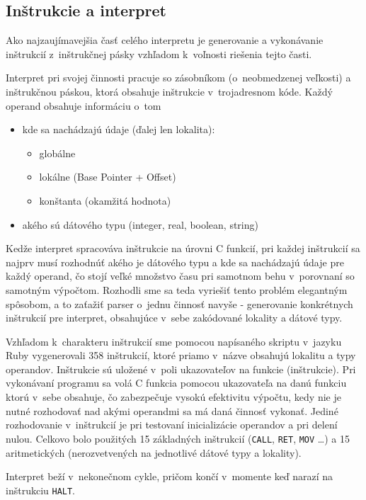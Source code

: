 \documentclass[12pt,a4paper,titlepage,final]{article}
\begin{document}
\subsection{Inštrukcie a interpret}
Ako najzaujímavejšia časť celého interpretu je generovanie a vykonávanie inštrukcií
z~inštrukčnej pásky vzhľadom k~voľnosti riešenia tejto časti.

Interpret pri svojej činnosti pracuje so zásobníkom (o~neobmedzenej veľkosti) a
inštrukčnou páskou, ktorá obsahuje inštrukcie v~trojadresnom kóde.
Každý operand obsahuje informáciu o~tom 
\begin{itemize}
	\item kde sa nachádzajú údaje (ďalej len lokalita):
		\begin{itemize}
			\item globálne
			\item lokálne (Base Pointer + Offset)
			\item konštanta (okamžitá hodnota)
		\end{itemize}
	\item akého sú dátového typu (integer, real, boolean, string)
\end{itemize}

Kedže interpret spracováva inštrukcie na úrovni C funkcií, pri každej inštrukcií
 sa najprv musí rozhodnúť akého je dátového typu a kde sa nachádzajú údaje pre 
 každý operand, čo stojí veľké množstvo času pri samotnom behu v~porovnaní 
 so samotným výpočtom.
Rozhodli sme sa teda vyriešiť tento problém elegantným spôsobom, 
 a to zaťažiť parser o~jednu činnosť navyše - generovanie konkrétnych 
 inštrukcií pre interpret, obsahujúce v~sebe zakódované lokality a dátové typy.

Vzhľadom k~charakteru inštrukcií sme pomocou napísaného skriptu v~jazyku Ruby
 vygenerovali 358 inštrukcií, 
 ktoré priamo v~názve obsahujú lokalitu a typy operandov.
Inštrukcie sú uložené v~poli ukazovateľov na funkcie (inštrukcie).
 Pri vykonávaní programu sa volá C funkcia pomocou ukazovateľa na danú 
 funkciu ktorú v~sebe obsahuje, čo zabezpečuje vysokú efektivitu výpočtu,
 kedy nie je nutné rozhodovať nad akými operandmi sa má daná činnosť vykonať.
 Jediné rozhodovanie v~inštrukcií je pri testovaní inicializácie operandov a pri delení nulou. Celkovo bolo použitých 15 základných inštrukcií (\texttt{CALL}, \texttt{RET}, \texttt{MOV} \ldots) a 
 15 aritmetických (nerozvetvených na jednotlivé dátové typy a lokality).

Interpret beží v~nekonečnom cykle, pričom končí v~momente keď narazí na inštrukciu
\texttt{HALT}.
\end{document}
